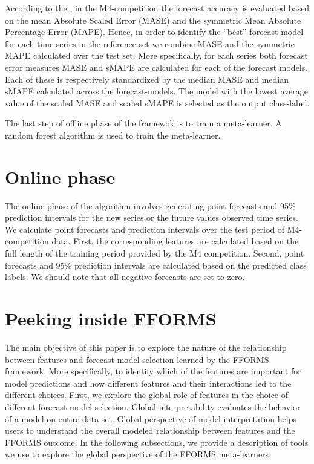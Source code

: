\documentclass[11pt,a4paper,]{article}
\begin{document}
According to the \textcite{M4compguide}, in the M4-competition the forecast accuracy is evaluated based on the mean Absolute Scaled Error (MASE) and the symmetric Mean Absolute Percentage Error (MAPE). Hence, in order to identify the ``best'' forecast-model for each time series in the reference set we combine MASE and the symmetric MAPE calculated over the test set. More specifically, for each series both forecast error measures MASE and sMAPE are calculated for each of the forecast models. Each of these is respectively standardized by the median MASE and median sMAPE calculated across the forecast-models. The model with the lowest average value of the scaled MASE and scaled sMAPE is selected as the output class-label.

The last step of offline phase of the framewok is to train a meta-learner. A random forest algorithm is used to train the meta-learner.

\hypertarget{online}{%
\section{Online phase}\label{online}}

The online phase of the algorithm involves generating point forecasts and 95\% prediction intervals for the new series or the future values observed time series. We calculate point forecasts and prediction intervals over the test period of M4-competition data. First, the corresponding features are calculated based on the full length of the training period provided by the M4 competition. Second, point forecasts and 95\% prediction intervals are calculated based on the predicted class labels. We should note that all negative forecasts are set to zero.

\hypertarget{peeking}{%
\section{Peeking inside FFORMS}\label{peeking}}

The main objective of this paper is to explore the nature of the relationship between features and forecast-model selection learned by the FFORMS framework. More specifically, to identify which of the features are important for model predictions and how different features and their interactions led to the different choices. First, we explore the global role of features in the choice of different forecast-model selection. Global interpretability evaluates the behavior of a model on entire data set. Global perspective of model interpretation helps users to understand the overall modeled relationship between features and the FFORMS outcome. In the following subsections, we provide a description of tools we use to explore the global perspective of the FFORMS meta-learners.
\end{document}
